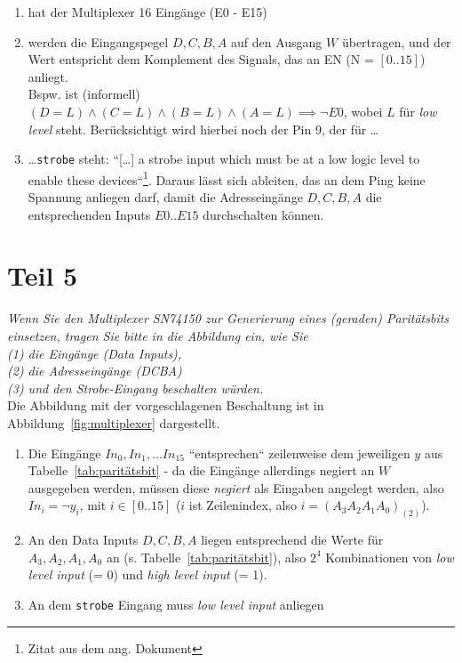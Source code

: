 \begin{enumerate}
    \itemsep0.5em
    \item hat der Multiplexer 16 Eingänge (E0 - E15)
    \item werden die Eingangspegel $D, C, B, A$ auf den Ausgang $W$ übertragen, und der Wert entspricht dem Komplement des Signals, das an EN (N = $[0..15]$) anliegt. \\
    Bspw. ist (informell) $(D = L) \land  (C = L) \land (B = L) \land (A = L) \implies \neg E0$, wobei $L$ für \textit{low level} steht.
    Berücksichtigt wird hierbei noch der Pin 9, der für \ldots
    \item \ldots \texttt{strobe} steht: ``[\ldots] a strobe input which must be at a low logic level to enable these devices``\footnote{
    Zitat aus dem ang. Dokument
    }.
    Daraus lässt sich ableiten, das an dem Ping keine Spannung anliegen darf, damit die Adresseingänge $D, C, B, A$ die entsprechenden Inputs $E0..E15$ durchschalten können.
\end{enumerate}

\section{Teil 5}

\textit{Wenn Sie den Multiplexer SN74150 zur Generierung eines (geraden)
Paritätsbits einsetzen, tragen Sie bitte in die Abbildung ein, wie Sie\\
(1) die Eingänge (Data Inputs),\\
(2) die Adresseingänge (DCBA)\\
(3) und den Strobe-Eingang beschalten würden.}\\

\noindent
Die Abbildung mit der vorgeschlagenen Beschaltung ist in Abbildung~\ref{fig:multiplexer} dargestellt.

\begin{enumerate}
    \itemsep0.5em
    \item Die Eingänge $In_0, In_1, \ldots In_{15}$ ``entsprechen`` zeilenweise dem jeweiligen $y$ aus Tabelle~\ref{tab:paritätsbit} -
    da die Eingänge allerdings negiert an $W$ ausgegeben werden, müssen diese \textit{negiert} als Eingaben angelegt werden, also
     $In_i = \neg y_i$, mit $i \in [0..15]$ ($i$ ist Zeilenindex, also $i = (A_3 A_2 A_1 A_0)_{(2)}$).
    \item An den Data Inputs $D, C, B, A$  liegen entsprechend die Werte für $A_3, A_2, A_1, A_0$ an (s. Tabelle~\ref{tab:paritätsbit}), also $2^4$ Kombinationen von \textit{low level input} (= 0) und \textit{high level input} (= 1).
    \item An dem \texttt{strobe} Eingang muss \textit{low level input} anliegen
\end{enumerate}

